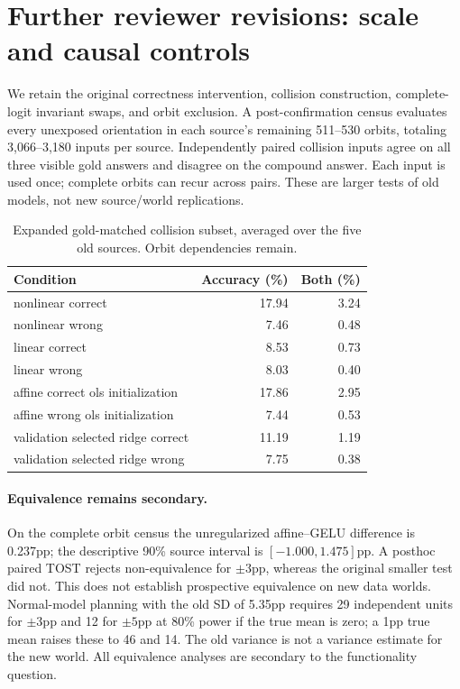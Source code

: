 \section{Further reviewer revisions: scale and causal controls}
We retain the original correctness intervention, collision construction, complete-logit invariant swaps, and orbit exclusion. A post-confirmation census evaluates every unexposed orientation in each source's remaining 511--530 orbits, totaling 3,066--3,180 inputs per source. Independently paired collision inputs agree on all three visible gold answers and disagree on the compound answer. Each input is used once; complete orbits can recur across pairs. These are larger tests of old models, not new source/world replications.

\begin{table}[ht]\centering\small
\begin{tabular}{lrr}\toprule Condition & Accuracy (\%) & Both (\%)\\\midrule
nonlinear correct & 17.94 & 3.24 \\
nonlinear wrong & 7.46 & 0.48 \\
linear correct & 8.53 & 0.73 \\
linear wrong & 8.03 & 0.40 \\
affine correct ols initialization & 17.86 & 2.95 \\
affine wrong ols initialization & 7.44 & 0.53 \\
validation selected ridge correct & 11.19 & 1.19 \\
validation selected ridge wrong & 7.75 & 0.38 \\
\bottomrule\end{tabular}
\caption{Expanded gold-matched collision subset, averaged over the five old sources. Orbit dependencies remain.}
\end{table}

\paragraph{Equivalence remains secondary.}
On the complete orbit census the unregularized affine--GELU difference is 0.237pp; the descriptive 90\% source interval is $[-1.000,1.475]$pp. A posthoc paired TOST rejects non-equivalence for $\pm3$pp, whereas the original smaller test did not. This does not establish prospective equivalence on new data worlds. Normal-model planning with the old SD of 5.35pp requires 29 independent units for $\pm3$pp and 12 for $\pm5$pp at 80\% power if the true mean is zero; a 1pp true mean raises these to 46 and 14. The old variance is not a variance estimate for the new world. All equivalence analyses are secondary to the functionality question.

